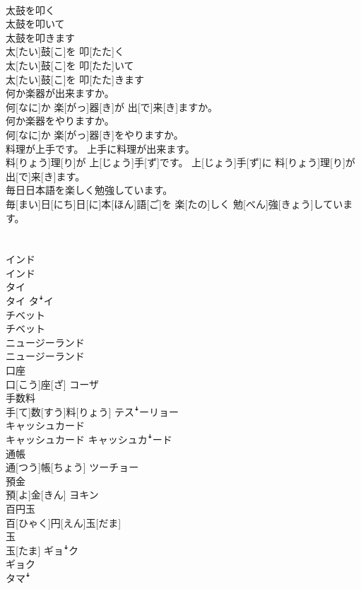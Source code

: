 \documentclass[8pt]{extreport}
\begin{document}
\begin{CJK}{UTF8}{min}
\\	太鼓を叩く 
\\	太鼓を叩いて 
\\	太鼓を叩きます	
\\	太[たい]鼓[こ]を 叩[たた]く 
\\	太[たい]鼓[こ]を 叩[たた]いて 
\\	太[たい]鼓[こ]を 叩[たた]きます
\\	何か楽器が出来ますか。	
\\	何[なに]か 楽[がっ]器[き]が 出[で]来[き]ますか。
\\	何か楽器をやりますか。	
\\	何[なに]か 楽[がっ]器[き]をやりますか。
\\	料理が上手です。 上手に料理が出来ます。	
\\	料[りょう]理[り]が 上[じょう]手[ず]です。 上[じょう]手[ず]に 料[りょう]理[り]が 出[で]来[き]ます。
\\	毎日日本語を楽しく勉強しています。	
\\	毎[まい]日[にち]日[に]本[ほん]語[ご]を 楽[たの]しく 勉[べん]強[きょう]しています。
\\	[シー]
\\	[ディー]	
\\	インド	
\\	インド	
\\	タイ	
\\	タイ	タꜜイ
\\	チベット	
\\	チベット	
\\	ニュージーランド	
\\	ニュージーランド	
\\	口座	
\\	口[こう]座[ざ]	コーザ
\\	手数料	
\\	手[て]数[すう]料[りょう]	テスꜜーリョー
\\	キャッシュカード	
\\	キャッシュカード	キャッシュカꜜード
\\	通帳	
\\	通[つう]帳[ちょう]	ツーチョー
\\	預金	
\\	預[よ]金[きん]	ヨキン
\\	百円玉	
\\	百[ひゃく]円[えん]玉[だま]	
\\	玉	
\\	玉[たま]	ギョꜜク 
\\	ギョク 
\\	タマꜜ

\end{CJK}
\end{document}
